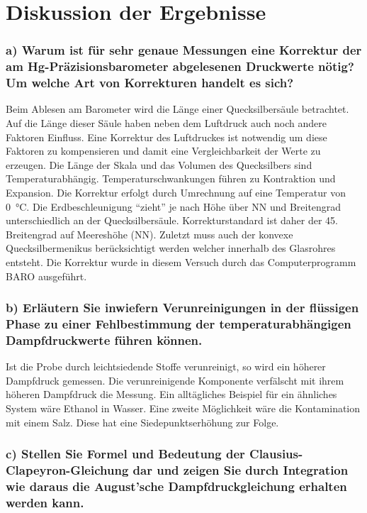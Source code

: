 \section{Diskussion der Ergebnisse}
\label{sec:diskussion}

\subsubsection*{a{)} Warum ist für sehr genaue Messungen eine Korrektur der am Hg-Präzisionsbarometer abgelesenen Druckwerte nötig? Um welche Art von Korrekturen handelt es sich?}
Beim Ablesen am Barometer wird die Länge einer Quecksilbersäule betrachtet. Auf die Länge dieser Säule haben neben dem Luftdruck auch noch andere Faktoren Einfluss. Eine Korrektur des Luftdruckes ist notwendig um diese Faktoren zu kompensieren und damit eine Vergleichbarkeit der Werte zu erzeugen. Die Länge der Skala und das Volumen des Quecksilbers sind Temperaturabhängig. Temperaturschwankungen führen zu Kontraktion und Expansion. Die Korrektur erfolgt durch Umrechnung auf eine Temperatur von \SI{0}{\degreeCelsius}. Die Erdbeschleunigung "`zieht"' je nach Höhe über NN und Breitengrad unterschiedlich an der Quecksilbersäule. Korrekturstandard ist daher der 45. Breitengrad auf Meereshöhe (NN). Zuletzt muss auch der konvexe Quecksilbermenikus berücksichtigt werden welcher innerhalb des Glasrohres entsteht. Die Korrektur wurde in diesem Versuch durch das Computerprogramm BARO ausgeführt. 
\cite{Barometerkorrektur}

\subsubsection*{b{)} Erläutern Sie inwiefern Verunreinigungen in der flüssigen Phase zu einer Fehlbestimmung der temperaturabhängigen Dampfdruckwerte führen können.}
Ist die Probe durch leichtsiedende Stoffe verunreinigt, so wird ein höherer Dampfdruck gemessen. Die verunreinigende Komponente verfälscht mit ihrem höheren Dampfdruck die Messung. Ein alltägliches Beispiel für ein ähnliches System wäre Ethanol in Wasser. Eine zweite Möglichkeit wäre die Kontamination mit einem Salz. Diese hat eine Siedepunktserhöhung zur Folge.\cite{Verunreinigungen}

\subsubsection*{c{)} Stellen Sie Formel und Bedeutung der Clausius-Clapeyron-Gleichung dar und zeigen Sie durch Integration wie daraus die August'sche Dampfdruckgleichung erhalten werden kann.}

